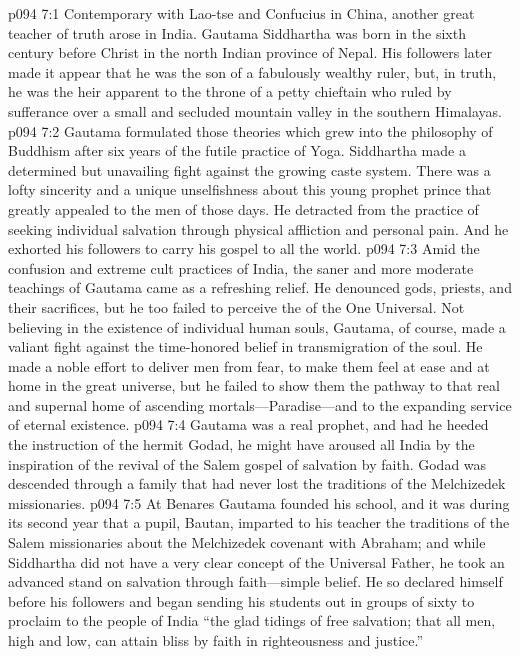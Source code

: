 \vs p094 7:1 Contemporary with Lao\hyp{}tse and Confucius in China, another great teacher of truth arose in India. Gautama Siddhartha was born in the sixth century before Christ in the north Indian province of Nepal. His followers later made it appear that he was the son of a fabulously wealthy ruler, but, in truth, he was the heir apparent to the throne of a petty chieftain who ruled by sufferance over a small and secluded mountain valley in the southern Himalayas.
\vs p094 7:2 Gautama formulated those theories which grew into the philosophy of Buddhism after six years of the futile practice of Yoga. Siddhartha made a determined but unavailing fight against the growing caste system. There was a lofty sincerity and a unique unselfishness about this young prophet prince that greatly appealed to the men of those days. He detracted from the practice of seeking individual salvation through physical affliction and personal pain. And he exhorted his followers to carry his gospel to all the world.\plusone
\vs p094 7:3 Amid the confusion and extreme cult practices of India, the saner and more moderate teachings of Gautama came as a refreshing relief. He denounced gods, priests, and their sacrifices, but he too failed to perceive the  of the One Universal. Not believing in the existence of individual human souls, Gautama, of course, made a valiant fight against the time\hyp{}honored belief in transmigration of the soul. He made a noble effort to deliver men from fear, to make them feel at ease and at home in the great universe, but he failed to show them the pathway to that real and supernal home of ascending mortals---Paradise---and to the expanding service of eternal existence.
\vs p094 7:4 Gautama was a real prophet, and had he heeded the instruction of the hermit Godad, he might have aroused all India by the inspiration of the revival of the Salem gospel of salvation by faith. Godad was descended through a family that had never lost the traditions of the Melchizedek missionaries.
\vs p094 7:5 At Benares Gautama founded his school, and it was during its second year that a pupil, Bautan, imparted to his teacher the traditions of the Salem missionaries about the Melchizedek covenant with Abraham; and while Siddhartha did not have a very clear concept of the Universal Father, he took an advanced stand on salvation through faith---simple belief. He so declared himself before his followers and began sending his students out in groups of sixty to proclaim to the people of India “the glad tidings of free salvation; that all men, high and low, can attain bliss by faith in righteousness and justice.”

